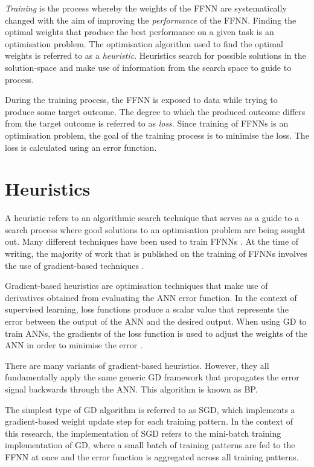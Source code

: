 \documentclass[preprint,review,12pt]{elsarticle}
\begin{document}
\textit{Training} is the process whereby the weights of the \acs{FFNN} are systematically changed with the aim of improving the \textit{performance} of the \acs{FFNN}. Finding the optimal weights that produce the best performance on a given task is an optimisation problem. The optimisation algorithm used to find the optimal weights is referred to as a \textit{heuristic}. Heuristics search for possible solutions in the solution-space and make use of information from the search space to guide to process.

During the training process, the \acs{FFNN} is exposed to data while trying to produce some target outcome. The degree to which the produced outcome differs from the target outcome is referred to as \textit{loss}. Since training of \acp{FFNN} is an optimisation problem, the goal of the training process is to minimise the loss. The loss is calculated using an error function.

\section{Heuristics}
\label{sec:heuristics}

A heuristic refers to an algorithmic search technique that serves as a guide to a search process where good solutions to an optimisation problem are being sought out. Many different techniques have been used to train \acp{FFNN} \citep{ref:kingma:2014}. At the time of writing, the majority of work that is published on the training of \acp{FFNN} involves the use of gradient-based techniques \citep{ref:nel:2021}.

Gradient-based heuristics are optimisation techniques that make use of derivatives obtained from evaluating the \acs{ANN} error function. In the context of supervised learning, loss functions produce a scalar value that represents the error between the output of the \acs{ANN} and the desired output. When using \acf{GD} to train \acp{ANN}, the gradients of the loss function is used to adjust the weights of the \acs{ANN} in order to minimise the error \citep{ref:engelbrecht:2007}.

There are many variants of gradient-based heuristics. However, they all fundamentally apply the same generic \acs{GD} framework that propagates the error signal backwards through the \acs{ANN}. This algorithm is known as \acf{BP}.

The simplest type of \acs{GD} algorithm is referred to as \acf{SGD}, which implements a gradient-based weight update step for each training pattern. In the context of this research, the implementation of \acs{SGD} refers to the mini-batch training implementation of \acs{GD}, where a small batch of training patterns are fed to the \acs{FFNN} at once and the error function is aggregated across all training patterns.
\end{document}
